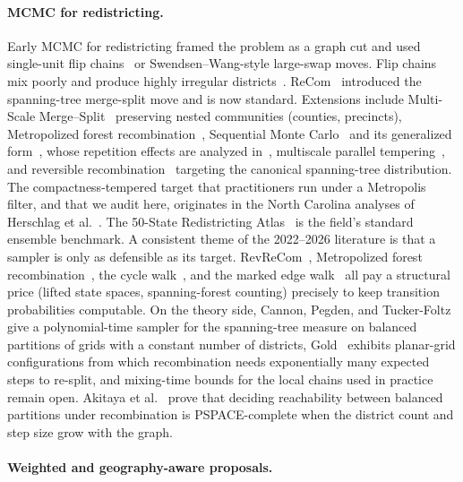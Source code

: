 \documentclass[11pt]{article}
\begin{document}
\paragraph{MCMC for redistricting.}\label{sec:related-mcmc}

Early MCMC for redistricting framed the problem as a graph cut and used
single-unit flip chains~\cite{fifield2020automated} or
Swendsen--Wang-style large-swap moves. Flip chains mix poorly and
produce highly irregular districts~\cite{deford2021recombination,
najt2024empirical}. ReCom~\cite{deford2021recombination} introduced
the spanning-tree merge-split move and is now standard. Extensions
include Multi-Scale Merge--Split~\cite{autry2020multiscale} preserving
nested communities (counties, precincts), Metropolized forest
recombination~\cite{autry2023metropolized}, Sequential Monte
Carlo~\cite{mccartan2023sequential} and its generalized
form~\cite{osullivan2026generalized}, whose repetition effects are
analyzed in~\cite{cannon2024repetition}, multiscale parallel
tempering~\cite{chuang2025multiscale}, and reversible
recombination~\cite{cannon2022spanning} targeting the canonical
spanning-tree distribution. The compactness-tempered target that
practitioners run under a Metropolis filter, and that we audit here,
originates in the North Carolina analyses of Herschlag et
al.~\cite{herschlag2020quantifying}. The 50-State Redistricting
Atlas~\cite{mccartan2022simulated} is the field's standard ensemble
benchmark. A consistent theme of the 2022--2026 literature is that a
sampler is only as defensible as its target.
RevReCom~\cite{cannon2022spanning}, Metropolized forest
recombination~\cite{autry2023metropolized}, the cycle
walk~\cite{deford2025cycle}, and the marked edge
walk~\cite{mcwhorter2025marked} all pay a structural price (lifted
state spaces, spanning-forest counting) precisely to keep transition
probabilities computable. On the theory side, Cannon, Pegden, and
Tucker-Foltz~\cite{cannon2024sampling} give a polynomial-time sampler
for the spanning-tree measure on balanced partitions of grids with a
constant number of districts, Gold~\cite{gold2026adversarial}
exhibits planar-grid configurations from which recombination needs
exponentially many expected steps to re-split, and mixing-time bounds
for the local chains used in practice remain open. Akitaya et
al.~\cite{akitaya2022reconfiguration} prove that deciding
reachability between balanced partitions under recombination is
PSPACE-complete when the district count and step size grow with the
graph.

\paragraph{Weighted and geography-aware proposals.}\label{sec:related-weighted}
\end{document}
